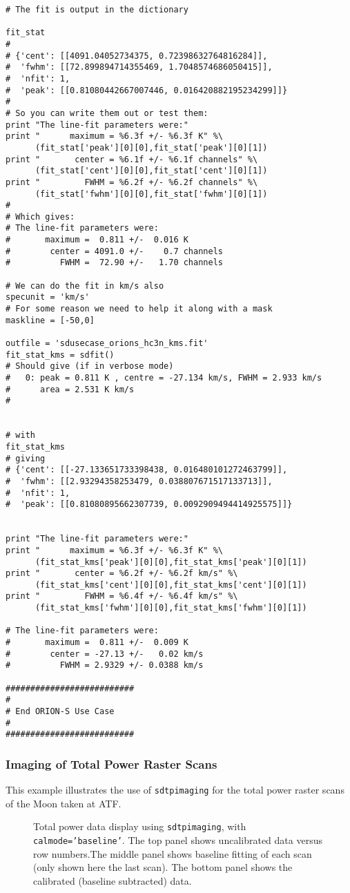 \begin{verbatim}
# The fit is output in the dictionary

fit_stat
#
# {'cent': [[4091.04052734375, 0.72398632764816284]],
#  'fwhm': [[72.899894714355469, 1.7048574686050415]],
#  'nfit': 1,
#  'peak': [[0.81080442667007446, 0.016420882195234299]]}
#
# So you can write them out or test them:
print "The line-fit parameters were:"
print "      maximum = %6.3f +/- %6.3f K" %\
      (fit_stat['peak'][0][0],fit_stat['peak'][0][1])
print "       center = %6.1f +/- %6.1f channels" %\
      (fit_stat['cent'][0][0],fit_stat['cent'][0][1])
print "         FWHM = %6.2f +/- %6.2f channels" %\
      (fit_stat['fwhm'][0][0],fit_stat['fwhm'][0][1])
#
# Which gives:
# The line-fit parameters were:
#       maximum =  0.811 +/-  0.016 K
#        center = 4091.0 +/-    0.7 channels
#          FWHM =  72.90 +/-   1.70 channels

# We can do the fit in km/s also
specunit = 'km/s'
# For some reason we need to help it along with a mask
maskline = [-50,0]

outfile = 'sdusecase_orions_hc3n_kms.fit'
fit_stat_kms = sdfit()
# Should give (if in verbose mode)
#   0: peak = 0.811 K , centre = -27.134 km/s, FWHM = 2.933 km/s
#      area = 2.531 K km/s
#


# with
fit_stat_kms
# giving
# {'cent': [[-27.133651733398438, 0.016480101272463799]],
#  'fwhm': [[2.93294358253479, 0.038807671517133713]],
#  'nfit': 1,
#  'peak': [[0.81080895662307739, 0.0092909494414925575]]}


print "The line-fit parameters were:"
print "      maximum = %6.3f +/- %6.3f K" %\
      (fit_stat_kms['peak'][0][0],fit_stat_kms['peak'][0][1])
print "       center = %6.2f +/- %6.2f km/s" %\
      (fit_stat_kms['cent'][0][0],fit_stat_kms['cent'][0][1])
print "         FWHM = %6.4f +/- %6.4f km/s" %\
      (fit_stat_kms['fwhm'][0][0],fit_stat_kms['fwhm'][0][1])

# The line-fit parameters were:
#       maximum =  0.811 +/-  0.009 K
#        center = -27.13 +/-   0.02 km/s
#          FWHM = 2.9329 +/- 0.0388 km/s

##########################
#
# End ORION-S Use Case
#
##########################
\end{verbatim}

\subsubsection{Imaging of Total Power Raster Scans}
This example illustrates the use of {\tt sdtpimaging} for the total
power raster scans of the Moon taken at ATF.
\begin{figure}[h!]
\begin{center}
\caption{\label{fig:sdtpimaging} Total power data display using {\tt sdtpimaging}, 
with {\tt calmode='baseline'}. The top  panel shows uncalibrated data versus row numbers.The middle panel shows baseline fitting of each scan (only shown here the last
scan). The bottom panel shows the calibrated (baseline subtracted) data. }
\hrulefill
\end{center}
\end{figure}

